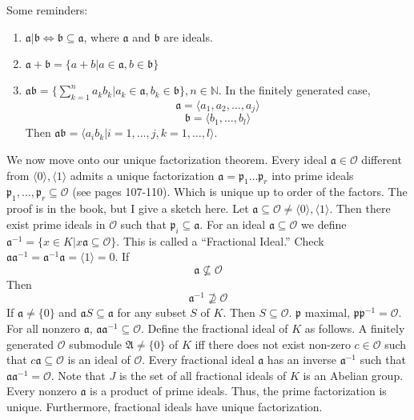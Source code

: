 \documentclass{article}
\begin{document}
Some reminders:
\begin{enumerate}
\item $\mathfrak{a}|\mathfrak{b} \iff \mathfrak{b} \subseteq \mathfrak{a}$,
where $\mathfrak{a}$ and $\mathfrak{b}$ are ideals. 
\item $\mathfrak{a} + \mathfrak{b} = \{ a + b | a \in \mathfrak{a}, b \in
\mathfrak{b} \}$
\item $\mathfrak{a}\mathfrak{b} = \{\sum_{k=1}^{n} a_kb_k | a_k\in \mathfrak{a}, b_k \in \mathfrak{b}
\}, n \in \mathbb{N}$. In the finitely generated case, 
\[ \mathfrak{a} = \langle a_1, a_2, \ldots, a_j \rangle \]
\[ \mathfrak{b} = \langle b_1, \ldots, b_l \rangle \]
Then $\mathfrak{a}\mathfrak{b} = \langle a_i b_k | i = 1,\ldots,j, k =
1,\ldots,l \rangle$. 
\end{enumerate}
We now move onto our unique factorization theorem. Every ideal $\mathfrak{a} \in
\mathcal{O}$ different from $\langle 0 \rangle, \langle 1 \rangle$
admits a unique factorization $\mathfrak{a} =
\mathfrak{p}_1\ldots\mathfrak{p}_r$ into prime ideals
$\mathfrak{p}_1,\ldots,\mathfrak{p}_r \subseteq \mathcal{O}$ (see pages
107-110). Which is unique up to order of the factors. The proof is in the book,
but I give a sketch here. Let $\mathfrak{a} \subseteq \mathcal{O} \neq
\langle0\rangle, \langle 1 \rangle$. Then there exist prime ideals in
$\mathcal{O}$ such that $\mathfrak{p}_i \subseteq \mathfrak{a}$. For an ideal
$\mathfrak{a} \subseteq \mathcal{O}$ we define $\mathfrak{a}^{-1} = \{ x \in K |
x\mathfrak{a} \subseteq \mathcal{O} \}$. This is called a ``Fractional Ideal.''
Check $\mathfrak{a}\mathfrak{a}^{-1} = \mathfrak{a}^{-1}\mathfrak{a} = \langle 1 \rangle =
0$. If
\[ \mathfrak{a} \not \subseteq \mathcal{O} \]
Then 
\[ \mathfrak{a}^{-1} \not\supseteq \mathcal{O} \]
If $\mathfrak{a} \neq \{ 0 \}$ and $\mathfrak{a} S \subseteq \mathfrak{a}$ for
any subset $S$ of $K$. Then $S \subseteq \mathcal{O}$. $\mathfrak{p}$ maximal,
$\mathfrak{p}\mathfrak{p}^{-1} = \mathcal{O}$. For all nonzero $\mathfrak{a}$,
$\mathfrak{a}\mathfrak{a}^{-1} \subseteq \mathcal{O}$. Define the fractional
ideal of $K$ as follows. A finitely generated $\mathcal{O}$ submodule
$\mathfrak{A} \neq \{0\}$ of $K$ iff there does not exist non-zero $c \in
\mathcal{O}$ such that $c\mathfrak{a} \subseteq \mathcal{O}$ is an ideal of
$\mathcal{O}$. Every fractional ideal $\mathfrak{a}$ has an inverse
$\mathfrak{a}^{-1}$ such that $\mathfrak{a}\mathfrak{a}^{-1} = \mathcal{O}$.
Note that $J$ is the set of all fractional ideals of $K$ is an Abelian group. 
Every nonzero $\mathfrak{a}$ is a product of prime ideals. Thus, the prime
factorization is unique. Furthermore, fractional ideals have unique
factorization. 
\end{document}
